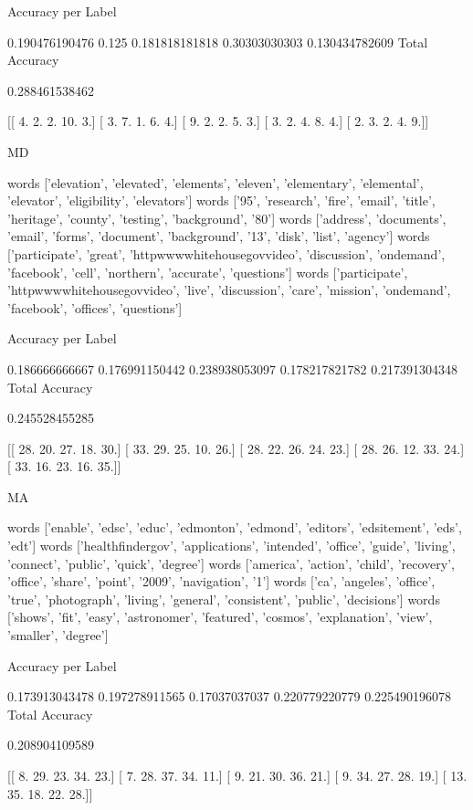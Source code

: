\documentclass[11pt]{article}
\begin{document}
\begin{verbatium}
Accuracy per Label

0.190476190476
0.125
0.181818181818
0.30303030303
0.130434782609
Total Accuracy

0.288461538462


[[  4.   2.   2.  10.   3.]
 [  3.   7.   1.   6.   4.]
 [  9.   2.   2.   5.   3.]
 [  3.   2.   4.   8.   4.]
 [  2.   3.   2.   4.   9.]]


MD


words
['elevation', 'elevated', 'elements', 'eleven', 'elementary', 'elemental', 'elevator', 'eligibility', 'elevators']
words
['95', 'research', 'fire', 'email', 'title', 'heritage', 'county', 'testing', 'background', '80']
words
['address', 'documents', 'email', 'forms', 'document', 'background', '13', 'disk', 'list', 'agency']
words
['participate', 'great', 'httpwwwwhitehousegovvideo', 'discussion', 'ondemand', 'facebook', 'cell', 'northern', 'accurate', 'questions']
words
['participate', 'httpwwwwhitehousegovvideo', 'live', 'discussion', 'care', 'mission', 'ondemand', 'facebook', 'offices', 'questions']

Accuracy per Label

0.186666666667
0.176991150442
0.238938053097
0.178217821782
0.217391304348
Total Accuracy

0.245528455285


[[ 28.  20.  27.  18.  30.]
 [ 33.  29.  25.  10.  26.]
 [ 28.  22.  26.  24.  23.]
 [ 28.  26.  12.  33.  24.]
 [ 33.  16.  23.  16.  35.]]


MA


words
['enable', 'edsc', 'educ', 'edmonton', 'edmond', 'editors', 'edsitement', 'eds', 'edt']
words
['healthfindergov', 'applications', 'intended', 'office', 'guide', 'living', 'connect', 'public', 'quick', 'degree']
words
['america', 'action', 'child', 'recovery', 'office', 'share', 'point', '2009', 'navigation', '1']
words
['ca', 'angeles', 'office', 'true', 'photograph', 'living', 'general', 'consistent', 'public', 'decisions']
words
['shows', 'fit', 'easy', 'astronomer', 'featured', 'cosmos', 'explanation', 'view', 'smaller', 'degree']

Accuracy per Label

0.173913043478
0.197278911565
0.17037037037
0.220779220779
0.225490196078
Total Accuracy

0.208904109589


[[  8.  29.  23.  34.  23.]
 [  7.  28.  37.  34.  11.]
 [  9.  21.  30.  36.  21.]
 [  9.  34.  27.  28.  19.]
 [ 13.  35.  18.  22.  28.]]



\end{verbatium}
\end{document}
